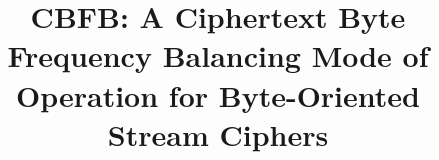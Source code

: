 \documentclass[conference]{IEEEtran}
\begin{document}
%
\title{CBFB: A Ciphertext Byte Frequency Balancing Mode of Operation for Byte-Oriented Stream Ciphers	}






% 








\maketitle
\end{document}
